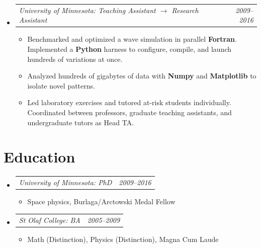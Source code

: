\documentclass[12pt,letterpaper]{article}
\makeatletter
\newcommand{\headerpair}[2]{
    \begin{tabular*}{\linewidth}{l@{ \extracolsep{\fill} }r} {\large\emph{#1}} & {\large\emph{#2}}
    \end{tabular*}
}
\newcommand{\headerrow}[3]{\headerpair{#2: #1}{#3}}
\newcommand{\YearRange}[2]{#1--#2}
\newcommand{\ResumeSection}[1]{\section*{{\color{MidnightBlue}#1 \sout{\hfill}}}}
\makeatother
\begin{document}
\begin{itemize}[leftmargin=\parindent]
    \item[]
        \headerrow
            {Teaching Assistant $\to$ Research Assistant}
            {University of Minnesota}
            {\YearRange{2009}{2016}}
        \begin{itemize}[leftmargin=\parindent]
            \item Benchmarked and optimized a wave simulation in parallel \textbf{Fortran}. Implemented a \textbf{Python} harness to configure, compile, and launch hundreds of variations at once.
            \item Analyzed hundreds of gigabytes of data with \textbf{Numpy} and \textbf{Matplotlib} to isolate novel patterns.
            \item Led laboratory exercises and tutored at-risk students individually. Coordinated between professors, graduate teaching assistants, and undergraduate tutors as Head TA.
        \end{itemize}

\end{itemize}

\ResumeSection{Education}

\begin{itemize}[leftmargin=\parindent]
    \parskip=0.1em
    \itemsep=1.2em

    \item[]
        \headerrow
            {PhD}
            {University of Minnesota}
            {\YearRange{2009}{2016}}
        \begin{itemize}[leftmargin=\parindent]
            \item Space physics, Burlaga/Arctowski Medal Fellow
        \end{itemize}
    \item[]
        \headerrow
            {BA}
            {St Olaf College}
            {\YearRange{2005}{2009}}
        \begin{itemize}[leftmargin=\parindent]
            \item Math (Distinction), Physics (Distinction),
                 Magna Cum Laude
        \end{itemize}
\end{itemize}
\end{document}
